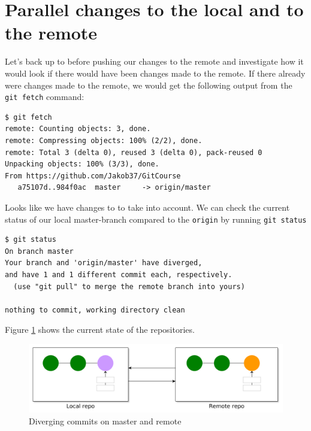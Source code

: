 \documentclass[../main/git_course_main.tex]{subfiles}
\begin{document}
\section{Parallel changes to the local and to the remote}

Let's back up to before pushing our changes to the remote and investigate how it would look if there would have been changes made to the remote. If there already were changes made to the remote, we would get the following output from the \verb$git fetch$ command:

\begin{codebox}
\begin{lstlisting}
$ git fetch
remote: Counting objects: 3, done.
remote: Compressing objects: 100% (2/2), done.
remote: Total 3 (delta 0), reused 3 (delta 0), pack-reused 0
Unpacking objects: 100% (3/3), done.
From https://github.com/Jakob37/GitCourse
   a75107d..984f0ac  master     -> origin/master
\end{lstlisting}
\end{codebox}

Looks like we have changes to to take into account. We can check the current status of our local master-branch compared to the \verb$origin$ by running \verb$git status$

\begin{codebox}
\begin{lstlisting}
$ git status
On branch master
Your branch and 'origin/master' have diverged,
and have 1 and 1 different commit each, respectively.
  (use "git pull" to merge the remote branch into yours)

nothing to commit, working directory clean
\end{lstlisting}
\end{codebox}

Figure \ref{fig:diverged_remote} shows the current state of the repositories.

\begin{figure}[h!]
	\centering
	\includegraphics[width=1.0\textwidth]{../visualizations/chapter5/55_diverging_commits.pdf}
	\caption{Diverging commits on master and remote}
	\label{fig:diverged_remote}
\end{figure}
\end{document}

